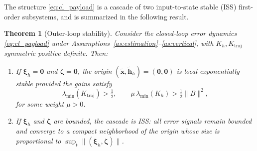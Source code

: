 \documentclass[sn-mathphys-num]{sn-jnl}
\theoremstyle{thmstyleone}%
\newtheorem{theorem}{Theorem}%
\theoremstyle{thmstyletwo}%
\theoremstyle{thmstylethree}%
\begin{document}
The structure \eqref{eq:cl_payload} is a cascade of two
input-to-state stable (ISS) first-order subsystems, and is summarized in the following
result.

\begin{theorem}[Outer-loop stability]\label{th:outer}
Consider the closed-loop error dynamics \eqref{eq:cl_payload}
under Assumptions~\ref{as:estimation}--\ref{as:vertical}, with $K_h,K_{\mathrm{traj}}$
symmetric positive definite. Then:
\begin{enumerate}
  \item[\textnormal{(a)}] If $\boldsymbol{\xi}_h=\mathbf{0}$ and $\boldsymbol{\zeta}=\mathbf{0}$,
  the origin $(\tilde{\mathbf{x}},\tilde{\mathbf{h}}_h)=(\mathbf{0},\mathbf{0})$ is
  local exponentially stable provided the gains satisfy
  \begin{equation}
  \lambda_{\min}(K_{\mathrm{traj}})>\tfrac{1}{2},\qquad
  \mu\,\lambda_{\min}(K_h)>\tfrac{1}{2}\|B\|^2,
  \label{eq:gain_condition}
  \end{equation}
  for some weight $\mu>0$.
  \item[\textnormal{(b)}] If $\boldsymbol{\xi}_h$ and $\boldsymbol{\zeta}$ are bounded,
  the cascade is ISS: all error signals remain bounded and converge to a compact
  neighborhood of the origin whose size is proportional to
  $\sup_t\|(\boldsymbol{\xi}_h,\boldsymbol{\zeta})\|$.
\end{enumerate}
\end{theorem}
\end{document}

